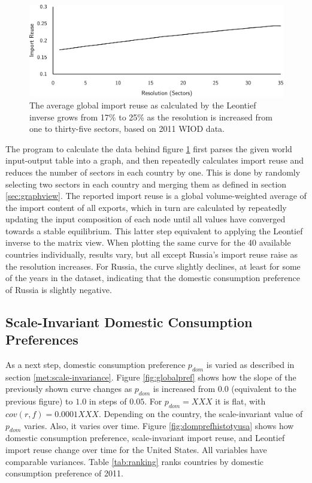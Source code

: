 \documentclass[english]{uzhpub}
\begin{document}
\begin{figure}
\centering
\includegraphics[scale=0.8]{../results/resolution}
\caption{The average global import reuse as calculated by the Leontief inverse grows from 17\% to 25\% as the resolution is increased from one to thirty-five sectors, based on 2011 WIOD data.} \label{fig:varying}
\end{figure}

The program to calculate the data behind figure \ref{fig:varying} first parses the given world input-output table into a graph, and then repeatedly calculates import reuse and reduces the number of sectors in each country by one. This is done by randomly selecting two sectors in each country and merging them as defined in section \ref{sec:graphview}. The reported import reuse is a global volume-weighted average of the import content of all exports, which in turn are calculated by repeatedly updating the input composition of each node until all values have converged towards a stable equilibrium. This latter step equivalent to applying the Leontief inverse to the matrix view. When plotting the same curve for the 40 available countries individually, results vary, but all except Russia's import reuse raise as the resolution increases. For Russia, the curve slightly declines, at least for some of the years in the dataset, indicating that the domestic consumption preference of Russia is slightly negative.

\subsection{Scale-Invariant Domestic Consumption Preferences}
As a next step, domestic consumption preference $p_{dom}$ is varied as described in section \ref{met:scale-invariance}. Figure \ref{fig:globalpref} shows how the slope of the previously shown curve changes as $p_{dom}$ is increased from $0.0$ (equivalent to the previous figure) to $1.0$ in steps of $0.05$. For $p_{dom}=XXX$ it is flat, with $cov(r, f) = 0.0001 XXX$. Depending on the country, the scale-invariant value of $p_{dom}$ varies. Also, it varies over time. Figure \ref{fig:domprefhistotyusa} shows how domestic consumption preference, scale-invariant import reuse, and Leontief import reuse change over time for the United States. All variables have comparable variances. Table \ref{tab:ranking} ranks countries by domestic consumption preference of 2011.
\end{document}
